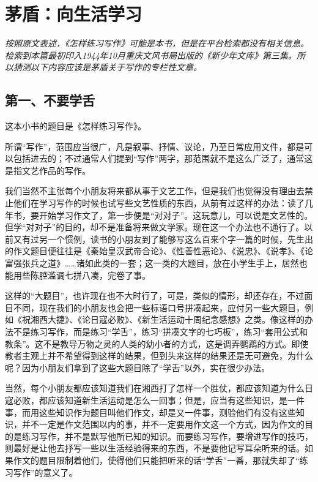 \documentclass[fontset=fandol,12pt,a5paper]{ctexbook}
\begin{document}
\newpage

\section{茅盾：向生活学习}

\emph{按照原文表述，《怎样练习写作》可能是本书，但是在平台检索都没有相关信息。检索到本篇最初印入1944年10月重庆文风书局出版的《新少年文库》第三集。所以猜测以下内容应该是茅盾关于写作的专栏性文章。}
\vspace{2em}

\subsection{第一、不要学舌}
这本小书的题目是《怎样练习写作》。

所谓“写作”，范围应当很广，凡是叙事、抒情、议论，乃至日常应用文件，都是可以包括进去的；不过通常人们提到“写作”两字，那范围就不是这么广泛了，通常这是指文艺作品的写作。

我们当然不主张每个小朋友将来都从事于文艺工作，但是我们也觉得没有理由去禁止他们在学习写作的时候也试写些文艺性质的东西，从前有过这样的办法：读了几年书，要开始学习作文了，第一步便是“对对子”。这玩意儿，可以说是文艺性的。但学“对对子”的目的，却不是准备将来做文学家。现在这一个办法也不通行了。以前又有过另一个惯例，读书的小朋友到了能够写这么百来个字一篇的时候，先生出的作文题目便往往是《秦始皇汉武帝合论》、《性善性恶论》、《说忠》、《说孝》、《论富强张兵之道》……诸如此类的一套；这一类的大题目，放在小学生手上，居然也能用些陈腔滥调七拼八凑，完卷了事。

这样的“大题目”，也许现在也不大时行了，可是，类似的情形，却还存在，不过面目不同，现在我们的小朋友也会把一些标语口号拼凑起来，应付另一些大题目，例如《祝湘西大捷》、《论日寇必败》、《新生活运动十周纪念感想》之类。像这样的办法不是练习写作，而是练习“学舌”，练习“拼凑文字的七巧板”，练习“套用公式和教条”。这不是教导万物之灵的人类的幼小者的方式，这是调弄鹦鹉的方式。即使教者主观上并不希望得到这样的结果，但到头来这样的结果还是无可避免，为什么呢？因为小朋友们拿到了这些大题目除了“学舌”以外，实在很少办法。

当然，每个小朋友都应该知道我们在湘西打了怎样一个胜仗，都应该知道为什么日寇必败，都应该知道新生活运动是怎么一回事；但是，应当有这些知识，是一件事，而用这些知识作为题目叫他们作文，却是又一件事，测验他们有没有这些知识，并不一定是作文范围以内的事，并不一定要用作文这一个方式，因为作文的目的是练习写作，并不是默写他所已知的知识。而要练习写作，要增进写作的技巧，则最好是让他去抒写一些以生活经验得来的东西，不是要他记写耳朵听来的话。如果作文的题目限制着他们，使得他们只能把听来的话“学舌”一番，那就失却了“练习写作”的意义了。
\end{document}

